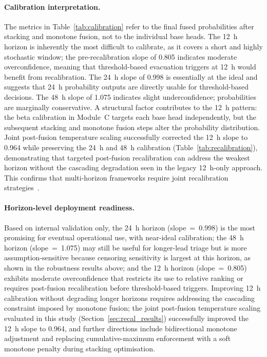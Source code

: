 \documentclass[fire,article,submit,pdftex]{../Definitions/mdpi}
\begin{document}
\paragraph{Calibration interpretation.}
The metrics in Table~\ref{tab:calibration} refer to the final fused probabilities after stacking and monotone fusion, not to the individual base heads.
The 12~h horizon is inherently the most difficult to calibrate, as it covers a short and highly stochastic window; the pre-recalibration slope of 0.805 indicates moderate overconfidence, meaning that threshold-based evacuation triggers at 12~h would benefit from recalibration.
The 24~h slope of 0.998 is essentially at the ideal and suggests that 24~h probability outputs are directly usable for threshold-based decisions.
The 48~h slope of 1.075 indicates slight underconfidence; probabilities are marginally conservative.
A structural factor contributes to the 12~h pattern: the beta calibration in Module~C targets each base head independently, but the subsequent stacking and monotone fusion steps alter the probability distribution.
Joint post-fusion temperature scaling successfully corrected the 12~h slope to 0.964 while preserving the 24~h and 48~h calibration (Table~\ref{tab:recalibration}), demonstrating that targeted post-fusion recalibration can address the weakest horizon without the cascading degradation seen in the legacy 12~h-only approach.
This confirms that multi-horizon frameworks require joint recalibration strategies~\cite{NiculescuMizil2005}.

\paragraph{Horizon-level deployment readiness.}
Based on internal validation only, the 24~h horizon (slope~=~0.998) is the most promising for eventual operational use, with near-ideal calibration; the 48~h horizon (slope~=~1.075) may still be useful for longer-lead triage but is more assumption-sensitive because censoring sensitivity is largest at this horizon, as shown in the robustness results above; and the 12~h horizon (slope~=~0.805) exhibits moderate overconfidence that restricts its use to relative ranking or requires post-fusion recalibration before threshold-based triggers.
Improving 12~h calibration without degrading longer horizons requires addressing the cascading constraint imposed by monotone fusion; the joint post-fusion temperature scaling evaluated in this study (Section~\ref{sec:recal_results}) successfully improved the 12~h slope to 0.964, and further directions include bidirectional monotone adjustment and replacing cumulative-maximum enforcement with a soft monotone penalty during stacking optimisation.
\end{document}
